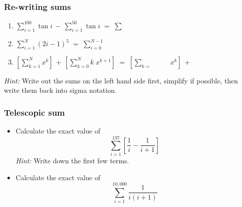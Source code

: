 \documentclass[14pt]{beamer}
\begin{document}

	\begin{frame}[t]
		\fontsize{13}{13}\selectfont
		\frametitle{Re-writing sums}

		\begin{enumerate}
			\item $\displaystyle \sum_{i=1}^{100}\tan i \, - \, \sum_{i=1}^{50}\tan i \;
				= \; \sum_{\boxed{\phantom{???}}}^{\boxed{\phantom{???}}}\boxed{\phantom{?????^f_p}}$
				\vfill

			\item $\displaystyle \sum_{i=1}^{N}(2i-1)^{5}\; = \; \sum_{i=0}^{N-1}\boxed
				{\phantom{?????^f_p}}$
				\vfill

			\item $\displaystyle \left[ \sum_{k=1}^{N}x^{k}\right] \, + \, \left[ \sum_{k=0}
				^{N}k \; x^{k+1}\right] \; = \; \left[ \sum_{k=\boxed{\phantom{???}}}^{\boxed{\phantom{???}}}
				\!\!\boxed{\phantom{???}}\,x^{k}\right] \, + \, \boxed{\phantom{???}}$
				\vfill
		\end{enumerate}

		\emph{Hint:} Write out the sums on the left hand side first, simplify if
		possible, then write them back into sigma notation.
	\end{frame}

	\begin{frame}[t]
		\frametitle{Telescopic sum}

		\begin{itemize}
			\item Calculate the exact value of
				\[
					\sum_{i=1}^{137}\left[ \frac{1}{i}- \frac{1}{i+1}\right]
				\]
				\emph{Hint:} Write down the first few terms.


			\item Calculate the exact value of
				\[
					\sum_{i=1}^{10,000}\frac{1}{i(i+1)}
				\]
		\end{itemize}
	\end{frame}

\end{document}
